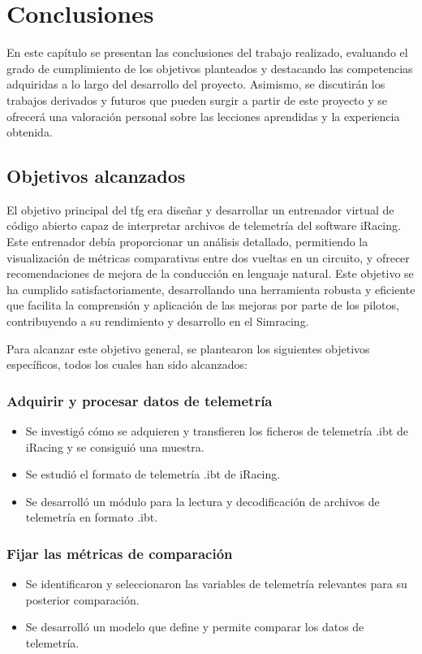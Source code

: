 \chapter{Conclusiones}
\label{cap:Conclusiones}

En este capítulo se presentan las conclusiones del trabajo realizado, evaluando el grado de cumplimiento de los objetivos planteados y destacando las competencias adquiridas a lo largo del desarrollo del proyecto. Asimismo, se discutirán los trabajos derivados y futuros que pueden surgir a partir de este proyecto y se ofrecerá una valoración personal sobre las lecciones aprendidas y la experiencia obtenida.


\section{Objetivos alcanzados}

El objetivo principal del \ac{tfg} era diseñar y desarrollar un entrenador virtual de código abierto capaz de interpretar archivos de telemetría del software iRacing. Este entrenador debía proporcionar un análisis detallado, permitiendo la visualización de métricas comparativas entre dos vueltas en un circuito, y ofrecer recomendaciones de mejora de la conducción en lenguaje natural. Este objetivo se ha cumplido satisfactoriamente, desarrollando una herramienta robusta y eficiente que facilita la comprensión y aplicación de las mejoras por parte de los pilotos, contribuyendo a su rendimiento y desarrollo en el Simracing.

Para alcanzar este objetivo general, se plantearon los siguientes objetivos específicos, todos los cuales han sido alcanzados:

\subsection{Adquirir y procesar datos de telemetría}
\begin{itemize}
    \item Se investigó cómo se adquieren y transfieren los ficheros de telemetría .ibt de iRacing y se consiguió una muestra.
    \item Se estudió el formato de telemetría .ibt de iRacing.
    \item Se desarrolló un módulo para la lectura y decodificación de archivos de telemetría en formato .ibt.
\end{itemize}

\subsection{Fijar las métricas de comparación}
\begin{itemize}
    \item Se identificaron y seleccionaron las variables de telemetría relevantes para su posterior comparación.
    \item Se desarrolló un modelo que define y permite comparar los datos de telemetría.
\end{itemize}

